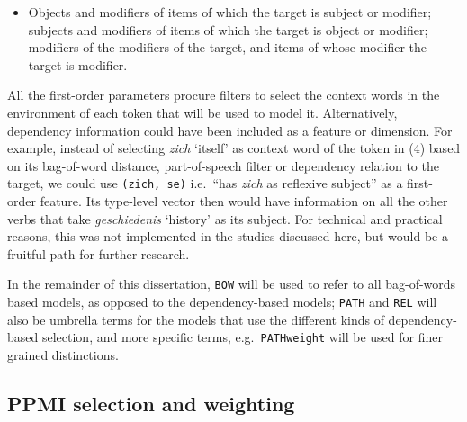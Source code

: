 \documentclass[
]{book}
\providecommand{\tightlist}{%
  \setlength{\itemsep}{0pt}\setlength{\parskip}{0pt}}
\begin{document}
\begin{itemize}
\tightlist
\item
  Objects and modifiers of items of which the target is subject or modifier; subjects and modifiers of items of which the target is object or modifier; modifiers of the modifiers of the target, and items of whose modifier the target is modifier.
\end{itemize}

All the first-order parameters procure filters to select the context words in the environment of each token that will be used to model it. Alternatively, dependency information could have been included as a feature or dimension. For example, instead of selecting \emph{zich} `itself' as context word of the token in (4) based on its bag-of-word distance, part-of-speech filter or dependency relation to the target, we could use \texttt{(zich,\ se)} i.e.~``has \emph{zich} as reflexive subject'' as a first-order feature. Its type-level vector then would have information on all the other verbs that take \emph{geschiedenis} `history' as its subject. For technical and practical reasons, this was not implemented in the studies discussed here, but would be a fruitful path for further research.

In the remainder of this dissertation, \texttt{BOW} will be used to refer to all bag-of-words based models, as opposed to the dependency-based models; \texttt{PATH} and \texttt{REL} will also be umbrella terms for the models that use the different kinds of dependency-based selection, and more specific terms, e.g.~\texttt{PATHweight} will be used for finer grained distinctions.

\hypertarget{pmisel}{%
\subsection{PPMI selection and weighting}\label{pmisel}}
\end{document}
